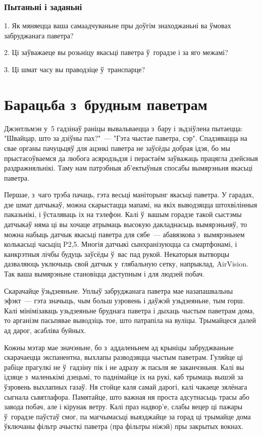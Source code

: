 \subsubsection{Пытаньні і заданьні}

1. Як мяняецца ваша самаадчуваньне пры доўгім знаходжаньні ва ўмовах забруджанага паветра?

2. Ці заўважаеце вы розьніцу якасьці паветра ў~горадзе і за яго межамі?

3. Ці шмат часу вы праводзіце ў~транспарце?


\section{Барацьба з~брудным паветрам}

Джэнтльмэн у~5 гадзінаў раніцы вывальваецца з~бару і зьдзіўлена пытаецца: "Швайцар, што за дзіўны пах?"~--- "Гэта чыстае паветра, сэр". Спадзявацца на свае органы пачуцьцяў для ацэнкі паветра не заўсёды добрая ідэя, бо мы прыстасоўваемся да любога асяродзьдзя і перастаём заўважаць працягла дзейсныя раздражняльнікі. Таму нам патрэбныя аб'ектыўныя спосабы вымярэньня якасьці паветра.

Першае, з~чаго трэба пачаць, гэта весьці маніторынг якасьці паветра. У гарадах, дзе шмат датчыкаў, можна скарыстацца мапамі, на якіх выводзяцца штохвілінныя паказьнікі, і ўсталяваць іх на тэлефон. Калі ў~вашым горадзе такой сыстэмы датчыкаў няма ці вы хочаце атрымаць высокую дакладнасьць вымярэньняў, то можна набыць датчык якасьці паветра для сябе~--- абавязкова з~вымярэньнем колькасьці часьціц P2,5. Многія датчыкі сынхранізуюцца са смартфонамі, і канкрэтныя лічбы будуць заўсёды ў~вас пад рукой. Некаторыя вытворцы дазваляюць уключыць свой датчык у~глябальную сетку, напрыклад, AirVision. Так ваша вымярэньне становіцца даступным і для людзей побач.

Скарачайце ўзьдзеяньне. Уплыў забруджанага паветра мае назапашвальны эфэкт~--- гэта значыць, чым больш узровень і даўжэй узьдзеяньне, тым горш. Калі мінімізаваць узьдзеяньне бруднага паветра і дыхаць чыстым паветрам дома, то арганізм пасьпявае выводзіць тое, што патрапіла на вуліцы. Трымайцеся далей ад дарог, асабліва буйных.

Кожны мэтар мае значэньне, бо з~аддаленьнем ад крыніцы забруджваньне скарачаецца экспанентна, выхлапы разводзяцца чыстым паветрам. Гуляйце ці рабіце прагулкі не ў~гадзіну пік і не адразу ж пасьля яе заканчэньня. Калі вы ідзяце з~маленькімі дзецьмі, то паднімайце іх на рукі, каб трымаць вышэй за ўзровень выхлапных газаў. Ня стойце каля самай дарогі, калі чакаеце зялёнага сыгнала сьвятлафора. Памятайце, што важная ня проста адсутнасьць трасы або завода побач, але і кірунак ветру. Калі праз надвор'е, слабы вецер ці пажары ў~горадзе паўстаў смог, па магчымасьці выязджайце за горад ці трымайце дома ўключаны фільтр ачысткі паветра (пра фільтры ніжэй) пры закрытых вокнах.

